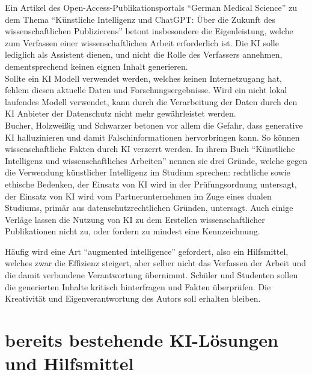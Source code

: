 \documentclass[../main.tex]{subfiles}
\begin{document}
Ein Artikel des Open-Access-Publikationsportals "`German Medical Science"' zu dem Thema "`Künstliche Intelligenz und ChatGPT: Über die Zukunft des wissenschaftlichen Publizierens"'
betont insbesondere die Eigenleistung, welche zum Verfassen einer wissenschaftlichen Arbeit erforderlich ist. Die KI solle lediglich als Assistent dienen, und
nicht die Rolle des Verfassers annehmen, dementsprechend keinen eignen Inhalt generieren. \\ Sollte ein KI Modell verwendet werden, welches keinen Internetzugang hat,
fehlem diesen aktuelle Daten und Forschungsergebnisse. Wird ein nicht lokal laufendes Modell verwendet, kann durch die Verarbeitung der Daten durch den KI Anbieter
der Datenschutz nicht mehr gewährleistet werden.\cite{ZukunftWissenschaftlichesPublizieren} \\ Bucher, Holzweißig und Schwarzer betonen vor allem die Gefahr, dass 
generative KI halluzinieren und damit Falschinformationen hervorbringen kann. So können wissenschaftliche Fakten durch KI verzerrt werden. In ihrem Buch "`Künstliche Intelligenz und wissenschaftliches Arbeiten"' nennen sie drei 
Gründe, welche gegen die Verwendung künstlicher Intelligenz im Studium sprechen: rechtliche sowie ethische Bedenken, der Einsatz von KI wird in der Prüfungsordnung untersagt, 
der Einsatz von KI wird vom Partnerunternehmen im Zuge eines dualen Studiums, primär aus datenschutzrechtlichen Gründen, untersagt.\cite{BucherSchwarzerHolzwweißig} Auch einige Verläge lassen 
die Nutzung von KI zu dem Erstellen wissenschaftlicher Publikationen nicht zu, oder fordern zu mindest eine Kennzeichnung\cite{ZukunftWissenschaftlichesPublizieren}. 

Häufig wird eine Art "`augmented intelligence"' gefordert, also ein Hilfsmittel, welches zwar die Effizienz steigert, aber selber nicht das Verfassen der 
Arbeit und die damit verbundene Verantwortung übernimmt. Schüler und Studenten sollen die generierten Inhalte kritisch hinterfragen und Fakten überprüfen. Die Kreativität und 
Eigenverantwortung des Autors soll erhalten bleiben.\cite{BucherSchwarzerHolzwweißig,humanWritingToAi,teachers,ZukunftWissenschaftlichesPublizieren} 

\section{bereits bestehende KI-Lösungen und Hilfsmittel}
\end{document}
